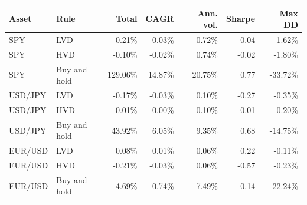 \begin{tabular}{llrrrrr}
\toprule
Asset & Rule & Total & CAGR & Ann. vol. & Sharpe & Max DD \\
\midrule
SPY & LVD & -0.21\% & -0.03\% & 0.72\% & -0.04 & -1.62\% \\
SPY & HVD & -0.10\% & -0.02\% & 0.74\% & -0.02 & -1.80\% \\
SPY & Buy and hold & 129.06\% & 14.87\% & 20.75\% & 0.77 & -33.72\% \\
USD/JPY & LVD & -0.17\% & -0.03\% & 0.10\% & -0.27 & -0.35\% \\
USD/JPY & HVD & 0.01\% & 0.00\% & 0.10\% & 0.01 & -0.20\% \\
USD/JPY & Buy and hold & 43.92\% & 6.05\% & 9.35\% & 0.68 & -14.75\% \\
EUR/USD & LVD & 0.08\% & 0.01\% & 0.06\% & 0.22 & -0.11\% \\
EUR/USD & HVD & -0.21\% & -0.03\% & 0.06\% & -0.57 & -0.23\% \\
EUR/USD & Buy and hold & 4.69\% & 0.74\% & 7.49\% & 0.14 & -22.24\% \\
\bottomrule
\end{tabular}
